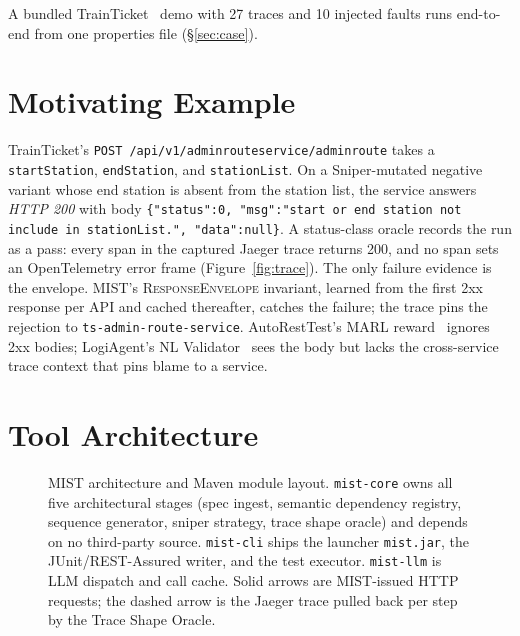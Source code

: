 \documentclass[10pt,conference]{IEEEtran}
\begin{document}
\noindent A bundled TrainTicket~\cite{Zhou2021TrainTicket} demo with 27 traces and 10 injected faults runs end-to-end from one properties file (\S\ref{sec:case}).

\section{Motivating Example}\label{sec:bg}

TrainTicket's \texttt{POST /api/v1/adminrouteservice/adminroute} takes a \texttt{startStation}, \texttt{endStation}, and \texttt{stationList}. On a Sniper-mutated negative variant whose end station is absent from the station list, the service answers \emph{HTTP 200} with body \texttt{\{"status":0, "msg":"start or end station not include in stationList.", "data":null\}}. A status-class oracle records the run as a pass: every span in the captured Jaeger trace returns 200, and no span sets an OpenTelemetry error frame (Figure~\ref{fig:trace}). The only failure evidence is the envelope. MIST's \textsc{ResponseEnvelope} invariant, learned from the first 2xx response per API and cached thereafter, catches the failure; the trace pins the rejection to \texttt{ts-admin-route-service}. AutoRestTest's MARL reward~\cite{Stennett2025AutoRestTest} ignores 2xx bodies; LogiAgent's NL Validator~\cite{Zhang2025LogiAgent} sees the body but lacks the cross-service trace context that pins blame to a service.

\section{Tool Architecture}\label{sec:arch}

\begin{figure}[t]
  \centering
  \resizebox{\textwidth}{!}{}
  \caption{MIST architecture and Maven module layout. \texttt{mist-core} owns all five architectural stages (spec ingest, semantic dependency registry, sequence generator, sniper strategy, trace shape oracle) and depends on no third-party source. \texttt{mist-cli} ships the launcher \texttt{mist.jar}, the JUnit/REST-Assured writer, and the test executor. \texttt{mist-llm} is LLM dispatch and call cache. Solid arrows are MIST-issued HTTP requests; the dashed arrow is the Jaeger trace pulled back per step by the Trace Shape Oracle.}
  \label{fig:arch}
\end{figure}
\end{document}
